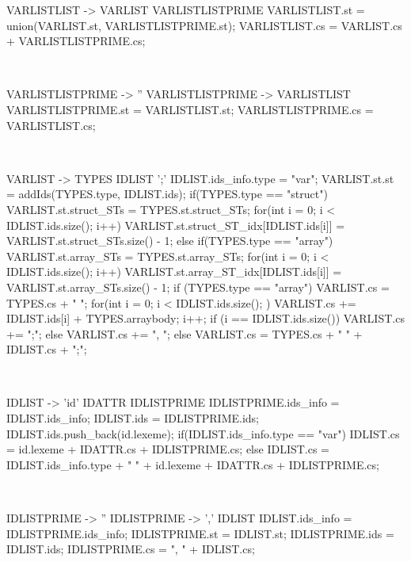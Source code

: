 \begin{verbbox}[\scriptsize]
VARLISTLIST -> VARLIST VARLISTLISTPRIME
{
VARLISTLIST.st = union(VARLIST.st, VARLISTLISTPRIME.st);
VARLISTLIST.cs = VARLIST.cs + VARLISTLISTPRIME.cs;
}
\end{verbbox}
\theverbbox\\

\begin{verbbox}[\scriptsize]
VARLISTLISTPRIME -> '' {}
VARLISTLISTPRIME -> VARLISTLIST
{
VARLISTLISTPRIME.st = VARLISTLIST.st;
VARLISTLISTPRIME.cs = VARLISTLIST.cs;
}
\end{verbbox}
\theverbbox\\

\begin{verbbox}[\scriptsize]
VARLIST -> TYPES IDLIST ';'
{
IDLIST.ids_info.type = "var";
VARLIST.st.st = addIds(TYPES.type, IDLIST.ids);
if(TYPES.type == "struct") {
    VARLIST.st.struct_STs = TYPES.st.struct_STs;
    for(int i = 0; i < IDLIST.ids.size(); i++) {
        VARLIST.st.struct_ST_idx[IDLIST.ids[i]] = VARLIST.st.struct_STs.size() - 1;
    }
} else if(TYPES.type == "array") {
    VARLIST.st.array_STs = TYPES.st.array_STs;
    for(int i = 0; i < IDLIST.ids.size(); i++) {
        VARLIST.st.array_ST_idx[IDLIST.ids[i]] = VARLIST.st.array_STs.size() - 1;
    }
}
if (TYPES.type == "array") {
    VARLIST.cs = TYPES.cs + " ";
    for(int i = 0; i < IDLIST.ids.size(); ) {
        VARLIST.cs += IDLIST.ids[i] + TYPES.arraybody;
        i++;
        if (i == IDLIST.ids.size()) {
            VARLIST.cs += ";\n";
        } else {
            VARLIST.cs += ", ";
        }
    }
} else {
    VARLIST.cs = TYPES.cs + " " + IDLIST.cs + ";\n";
}
}
\end{verbbox}
\theverbbox\\

\begin{verbbox}[\scriptsize]
IDLIST -> 'id' IDATTR IDLISTPRIME
{
IDLISTPRIME.ids_info = IDLIST.ids_info;
IDLIST.ids = IDLISTPRIME.ids; 
IDLIST.ids.push_back(id.lexeme);
if(IDLIST.ids_info.type == "var") {
    IDLIST.cs = id.lexeme + IDATTR.cs + IDLISTPRIME.cs;
} else {
    IDLIST.cs = IDLIST.ids_info.type + " " + id.lexeme + IDATTR.cs + IDLISTPRIME.cs;
}
}
\end{verbbox}
\theverbbox\\

\begin{verbbox}[\scriptsize]
IDLISTPRIME -> '' {}
IDLISTPRIME -> ',' IDLIST
{
IDLIST.ids_info =  IDLISTPRIME.ids_info;
IDLISTPRIME.st = IDLIST.st;
IDLISTPRIME.ids = IDLIST.ids;
IDLISTPRIME.cs = ", " + IDLIST.cs;
}
\end{verbbox}
\theverbbox\\

